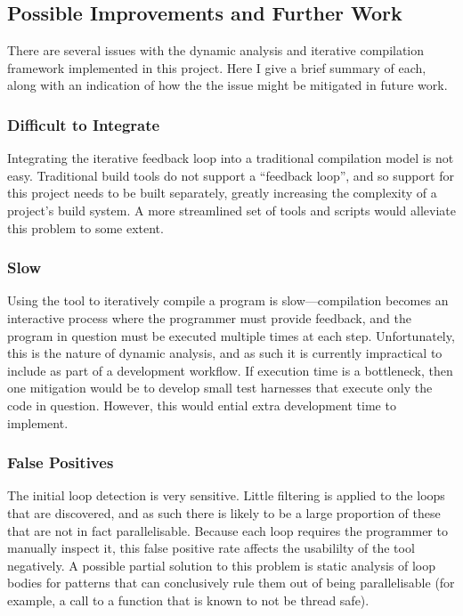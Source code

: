 \documentclass[journal]{IEEEtran}
\begin{document}
\subsection{Possible Improvements and Further Work}

There are several issues with the dynamic analysis and iterative compilation
framework implemented in this project. Here I give a brief summary of each,
along with an indication of how the the issue might be mitigated in future work.

\subsubsection{Difficult to Integrate}

Integrating the iterative feedback loop into a traditional compilation model is
not easy. Traditional build tools do not support a ``feedback loop'', and so
support for this project needs to be built separately, greatly increasing the
complexity of a project's build system. A more streamlined set of tools and
scripts would alleviate this problem to some extent.

\subsubsection{Slow} 

Using the tool to iteratively compile a program is slow---compilation becomes an
interactive process where the programmer must provide feedback, and the program
in question must be executed multiple times at each step.  Unfortunately, this
is the nature of dynamic analysis, and as such it is currently impractical to
include as part of a development workflow. If execution time is a bottleneck,
then one mitigation would be to develop small test harnesses that execute only
the code in question. However, this would ential extra development time to
implement.

\subsubsection{False Positives}

The initial loop detection is very sensitive. Little filtering is applied to the
loops that are discovered, and as such there is likely to be a large proportion
of these that are not in fact parallelisable. Because each loop requires the
programmer to manually inspect it, this false positive rate affects the
usabililty of the tool negatively. A possible partial solution to this problem
is static analysis of loop bodies for patterns that can conclusively rule them
out of being parallelisable (for example, a call to a function that is known to
not be thread safe).
\end{document}
